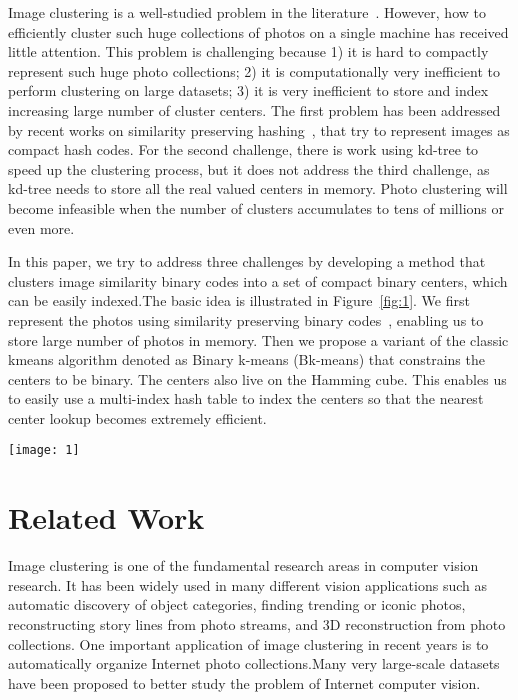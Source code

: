 \documentclass[10pt,twocolumn,letterpaper]{article}
\begin{document}
Image clustering is a well-studied problem in the literature~\cite{Kim2008Unsupervised}. However, how to efficiently cluster such huge collections of photos on a single machine has received little attention. This problem is challenging because
1) it is hard to compactly represent such huge photo collections;
2) it is computationally very inefficient to perform clustering on large datasets;
3) it is very inefficient to store and index increasing large number of cluster centers.
The first problem has been addressed by recent works on similarity preserving hashing~\cite{Gong2013Iterative}, that try to represent images as compact hash codes. For the second challenge, there is work using kd-tree to speed up the clustering process, but it does not address the third challenge, as kd-tree needs to store all the real valued centers in memory. Photo clustering will become infeasible when the number of clusters accumulates to tens of millions or even more.

In this paper, we try to address three challenges by developing a method that clusters image similarity binary codes into a set of compact binary centers, which can be easily indexed.The basic idea is illustrated in Figure~\ref{fig:1}. We first represent the photos using similarity preserving binary codes~\cite{Norouzi2011Minimal}, enabling us to store large number of photos in memory. Then we propose a variant of the classic kmeans algorithm denoted as Binary k-means (Bk-means) that constrains the centers to be binary. The centers also live on the Hamming cube. This enables us to easily use a multi-index hash table to index the centers so that the nearest center lookup becomes extremely efficient.
\begin{figure*}
\centering
\texttt{[image: 1]}
\caption{The problem setting of this paper. We are interested in clustering a large amount of image hash codes into compact binary centers.}
\label{fig:1}
\end{figure*}

\section{Related Work}
Image clustering is one of the fundamental research areas in computer vision research. It has been widely used in many different vision applications such as automatic discovery of object categories, finding trending or iconic photos, reconstructing story lines from photo streams, and 3D reconstruction from photo collections.
One important application of image clustering in recent years is to automatically organize Internet photo collections.Many very large-scale datasets have been proposed to better study the problem of Internet computer vision.
\end{document}
